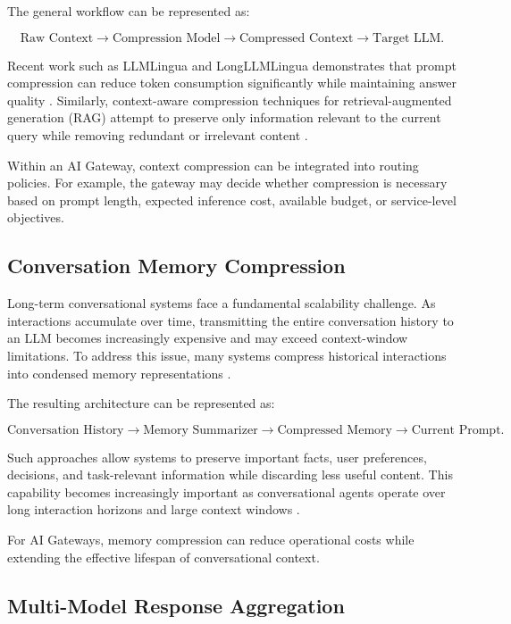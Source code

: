 \documentclass[11pt,a4paper]{article}
\begin{document}
The general workflow can be represented as:

\[
\text{Raw Context}
\rightarrow
\text{Compression Model}
\rightarrow
\text{Compressed Context}
\rightarrow
\text{Target LLM}.
\]

Recent work such as LLMLingua and LongLLMLingua demonstrates that prompt compression can reduce token consumption significantly while maintaining answer quality \cite{jiang2023llmlingua,jiang2024longllmlinguaacceleratingenhancingllms}. Similarly, context-aware compression techniques for retrieval-augmented generation (RAG) attempt to preserve only information relevant to the current query while removing redundant or irrelevant content \cite{verma2024contextualcompressionretrievalaugmentedgeneration}.

Within an AI Gateway, context compression can be integrated into routing policies. For example, the gateway may decide whether compression is necessary based on prompt length, expected inference cost, available budget, or service-level objectives.

\subsection{Conversation Memory Compression}

Long-term conversational systems face a fundamental scalability challenge. As interactions accumulate over time, transmitting the entire conversation history to an LLM becomes increasingly expensive and may exceed context-window limitations. To address this issue, many systems compress historical interactions into condensed memory representations \cite{wu2021memorizing}.

The resulting architecture can be represented as:

\[
\text{Conversation History}
\rightarrow
\text{Memory Summarizer}
\rightarrow
\text{Compressed Memory}
\rightarrow
\text{Current Prompt}.
\]

Such approaches allow systems to preserve important facts, user preferences, decisions, and task-relevant information while discarding less useful content. This capability becomes increasingly important as conversational agents operate over long interaction horizons and large context windows \cite{bertsch2023lostmiddle,wu2021memorizing}.

For AI Gateways, memory compression can reduce operational costs while extending the effective lifespan of conversational context.

\subsection{Multi-Model Response Aggregation}
\end{document}
